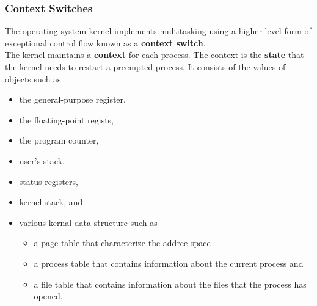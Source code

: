 \documentclass[11pt]{article}
\begin{document}
\subsubsection{Context Switches}
\label{sec:org2577f2c}
The operating system kernel implements multitasking using a higher-level form of exceptional control flow known as a \textbf{context switch}.\\


The kernel maintains a \textbf{context} for each process. The context is the \textbf{state} that the kernel needs to restart a preempted process. It consists of the values of objects such as\\
\begin{itemize}
\item the general-purpose register,\\
\item the floating-point regists,\\
\item the program counter,\\
\item user's stack,\\
\item status registers,\\
\item kernel stack, and\\
\item various kernal data structure such as\\
\begin{itemize}
\item a page table that characterize the addree space\\
\item a process table that contains information about the current process and\\
\item a file table that contains information about the files that the process has opened.\\
\end{itemize}
\end{itemize}
\end{document}
